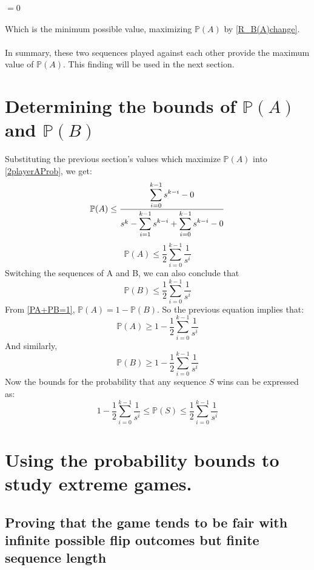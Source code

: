 \documentclass[english,12pt,a4paper,final]{article}
\begin{document}
$=0$
\\\\
Which is the minimum possible value, maximizing $\mathbb{P}(A)$ by \eqref{R_B(A)change}.
\\\\
In summary, these two sequences played against each other provide the maximum value of $\mathbb{P}(A)$. This finding will be used in the next section.

\section{Determining the bounds of $\mathbb{P}(A)$ and $\mathbb{P}(B)$}

Substituting the previous section's values which maximize $\mathbb{P}(A)$ into \eqref{2playerAProb}, we get:
\[
\mathbb{P}(A) \le \frac{\mathlarger{\sum_{i=0}^{k-1}s^{k-i}} - 0}{s^k-\mathlarger{\sum_{i=1}^{k-1}s^{k-i}}+\mathlarger{\sum_{i=0}^{k-1}s^{k-i}}-0}
\]
\begin{equation}\label{PAMax}
	\mathbb{P}(A) \le \frac{1}{2}\sum_{i=0}^{k-1}\frac{1}{s^i}
\end{equation}
Switching the sequences of A and B, we can also conclude that
\begin{equation*}
	\mathbb{P}(B) \le \frac{1}{2}\sum_{i=0}^{k-1}\frac{1}{s^i}
\end{equation*}
From \eqref{PA+PB=1}, $\mathbb{P}(A) = 1-\mathbb{P}(B)$. So the previous equation implies that:
\begin{equation*}
	\mathbb{P}(A) \ge 1-\frac{1}{2}\sum_{i=0}^{k-1}\frac{1}{s^i}
\end{equation*}
And similarly,
\begin{equation*}
	\mathbb{P}(B) \ge 1-\frac{1}{2}\sum_{i=0}^{k-1}\frac{1}{s^i}
\end{equation*}
Now the bounds for the probability that any sequence $S$ wins can be expressed as:
\begin{equation}\label{PBounds}
	1-\frac{1}{2}\sum_{i=0}^{k-1}\frac{1}{s^i} \le \mathbb{P}(S) \le \frac{1}{2}\sum_{i=0}^{k-1}\frac{1}{s^i}
\end{equation}

\section{Using the probability bounds to study extreme games.}

\subsection{Proving that the game tends to be fair with infinite possible flip outcomes but finite sequence length}
\end{document}
